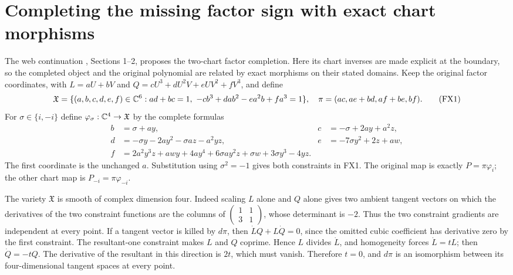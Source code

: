 \section{Completing the missing factor sign with exact chart morphisms}
The web continuation \cite{fullfable:WebFable}, Sections 1--2, proposes the
two-chart factor completion. Here its chart inverses are made explicit
at the boundary, so the completed object and the original polynomial
are related by exact morphisms on their stated domains.
Keep the original factor coordinates, with
$L=aU+bV$ and $Q=cU^3+dU^2V+eUV^2+fV^3$, and define
\[
 \mathfrak X=\{(a,b,c,d,e,f)\in\mathbb C^6:
 ad+bc=1,\ -cb^3+dab^2-ea^2b+fa^3=1\},
 \quad\pi=(ac,ae+bd,af+be,bf). \tag{FX1}
\]
For $\sigma\in\{i,-i\}$ define $\varphi_\sigma:\mathbb C^4\to\mathfrak X$
by the complete formulas
\[
 \begin{aligned}
 b&=\sigma+ay,&c&=-\sigma+2ay+a^2z,\\
 d&=-\sigma y-2ay^2-\sigma az-a^2yz,&
 e&=-7\sigma y^2+2z+aw,\\
 f&=2a^2y^3z+awy+4ay^4+6\sigma ay^2z+\sigma w
                                      +3\sigma y^3-4yz.
 \end{aligned} \tag{FX2}
\]
The first coordinate is the unchanged $a$.
Substitution using $\sigma^2=-1$ gives both constraints in FX1.
The original map is exactly $P=\pi\varphi_i$; the other chart
map is $P_{-i}=\pi\varphi_{-i}$.

The variety $\mathfrak X$ is smooth of complex dimension four.
Indeed scaling $L$ alone and $Q$ alone gives two ambient tangent
vectors on which the derivatives of the two constraint functions
are the columns of
$\left(\begin{smallmatrix}1&1\\3&1\end{smallmatrix}\right)$,
whose determinant is $-2$. Thus the two constraint gradients are
independent at every point. If a tangent vector is killed by
$d\pi$, then $\dot LQ+L\dot Q=0$, since the omitted cubic
coefficient has derivative zero by the first constraint. The
resultant-one constraint makes $L$ and $Q$ coprime. Hence $L$
divides $\dot L$, and homogeneity forces $\dot L=tL$;
then $\dot Q=-tQ$. The derivative of the resultant in this
direction is $2t$, which must vanish. Therefore $t=0$, and
$d\pi$ is an isomorphism between its four-dimensional tangent
spaces at every point.

